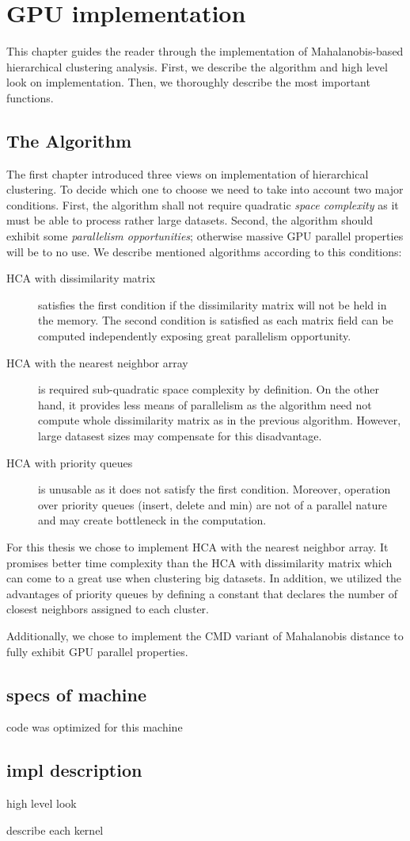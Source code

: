 \chapter{GPU implementation}

This chapter guides the reader through the implementation of Mahalanobis-based hierarchical clustering analysis. First, we describe the algorithm and high level look on implementation. Then, we thoroughly describe the most important functions.

\section{The Algorithm}

The first chapter introduced three views on implementation of hierarchical clustering. To decide which one to choose we need to take into account two major conditions. First, the algorithm shall not require quadratic \emph{space complexity} as it must be able to process rather large datasets. Second, the algorithm should exhibit some \emph{parallelism opportunities}; otherwise massive GPU parallel properties will be to no use.  We describe mentioned algorithms according to this conditions:
\begin{description}

\item[HCA with dissimilarity matrix] satisfies the first condition if the dissimilarity matrix will not be held in the memory. The second condition is satisfied as each matrix field can be computed independently exposing great parallelism opportunity. 

\item[HCA with the nearest neighbor array] is required sub-quadratic space complexity by definition. On the other hand, it provides less means of parallelism as the algorithm need not compute whole dissimilarity matrix as in the previous algorithm. However, large datasest sizes may compensate for this disadvantage. 

\item[HCA with priority queues] is unusable as it does not satisfy the first condition. Moreover, operation over priority queues (insert, delete and min) are not of a parallel nature and may create bottleneck in the computation.

\end{description}

For this thesis we chose to implement HCA with the nearest neighbor array. It promises better time complexity than the HCA with dissimilarity matrix which can come to a great use when clustering big datasets. In addition, we utilized the advantages of priority queues by defining a constant that declares the number of closest neighbors assigned to each cluster.

Additionally, we chose to implement the CMD variant of Mahalanobis distance to fully exhibit GPU parallel properties.

\section{specs of machine}

code was optimized for this machine

\section{impl description} 

high level look

describe each kernel 